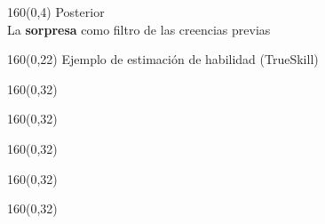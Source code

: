 \documentclass[shownotes,aspectratio=169]{beamer}
\begin{document}
\begin{frame}[plain]
\begin{textblock}{160}(0,4)
 \centering \LARGE Posterior \\
 \Large La \textbf{sorpresa} como filtro de las creencias previas
 \end{textblock}


 \begin{textblock}{160}(0,22) \centering
 Ejemplo de estimación de habilidad (TrueSkill)
 \end{textblock}
 
 

\begin{textblock}{160}(0,32)
\centering
{}
\end{textblock}

\begin{textblock}{160}(0,32)
\centering
{}
\end{textblock}

\begin{textblock}{160}(0,32)
\centering
{}
\end{textblock}

\begin{textblock}{160}(0,32)
\centering
{}
\end{textblock}


\begin{textblock}{160}(0,32)
\centering
{}
\end{textblock}



\end{frame}
\end{document}
